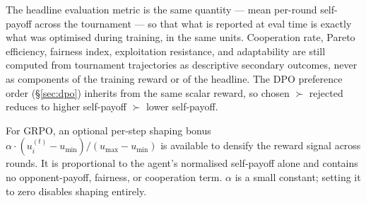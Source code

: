 The headline evaluation metric is the same quantity --- mean per-round
self-payoff across the tournament --- so that what is reported at eval
time is exactly what was optimised during training, in the same units.
Cooperation rate, Pareto efficiency, fairness index, exploitation
resistance, and adaptability are still computed from tournament
trajectories as descriptive secondary outcomes, never as components of
the training reward or of the headline. The DPO preference order
(\S\ref{sec:dpo}) inherits from the same scalar reward, so chosen
$\succ$ rejected reduces to higher self-payoff $\succ$ lower self-payoff.

For GRPO, an optional per-step shaping bonus
$\alpha \cdot (u_i^{(t)} - u_{\min}) / (u_{\max} - u_{\min})$ is available
to densify the reward signal across rounds. It is proportional to the
agent's normalised self-payoff alone and contains no opponent-payoff,
fairness, or cooperation term. $\alpha$ is a small constant; setting it
to zero disables shaping entirely.
